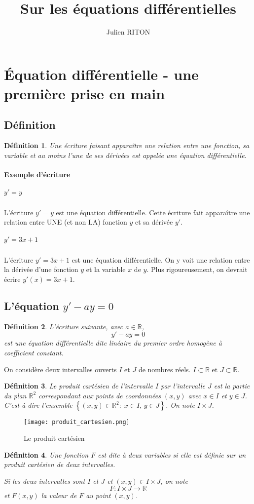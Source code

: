 \documentclass[10pt,a4paper]{article}
\author{Julien RITON}
\title{Sur les équations différentielles}
\newtheorem{dfn}{Définition}
\begin{document}
\maketitle
\section{Équation différentielle - une première prise en main}
\subsection{Définition}
\begin{dfn}
Une écriture faisant apparaître une relation entre une fonction, sa variable et au moins l'une de ses dérivées est appelée une équation différentielle.
\end{dfn}
\paragraph{Exemple d'écriture}

\subparagraph{$y'=y$}
L'écriture $y'=y$ est une équation différentielle. Cette écriture fait apparaître une relation entre UNE (et non LA) fonction $y$
et sa dérivée $y'$.

\subparagraph{$y'= 3x+1$}
L'écriture $y'= 3x+1$ est une équation différentielle. On y voit une relation entre la dérivée d'une fonction $y$ et la variable $x$ de $y$. Plus rigoureusement, on devrait écrire $y'(x)=3x+1$.


\subsection{L'équation $y'-ay=0$}




\begin{dfn}
L'écriture suivante, avec $a\in\mathbb{R}$,
$$y'-ay=0$$
est une équation différentielle dite linéaire du premier ordre homogène à coefficient constant.
\end{dfn}


On considère deux intervalles ouverts $I$ et $J$ de nombres réels.
$I\subset \mathbb{R}$ et $J\subset \mathbb{R}$.

\begin{dfn}
Le \textit{produit cartésien} de l'intervalle $I$ par l'intervalle $J$ est la partie du plan
$\mathbb{R}^2$
correspondant aux points de coordonnées $(x,y)$ avec $x\in I$ et $y\in J$.
C'est-à-dire l'ensemble $\left\lbrace (x,y) \in \mathbb{R}^2:\; x\in I,\, y\in J \right\rbrace$.
On note $I\times J$.
\end{dfn}
\begin{figure}[hbtp]
\centering
\texttt{[image: produit\_cartesien.png]}
\caption{Le produit cartésien}
\end{figure}

\begin{dfn}
Une fonction $F$ est dite à deux variables si elle est définie sur un produit cartésien de deux intervalles.

Si les deux intervalles sont $I$ et $J$ et $(x,y)\in I \times J$, on note 
$$F:I\times J \rightarrow \mathbb{R}$$
et $F(x,y)$ la valeur de $F$ au point $(x,y)$.
\end{dfn}
\end{document}
